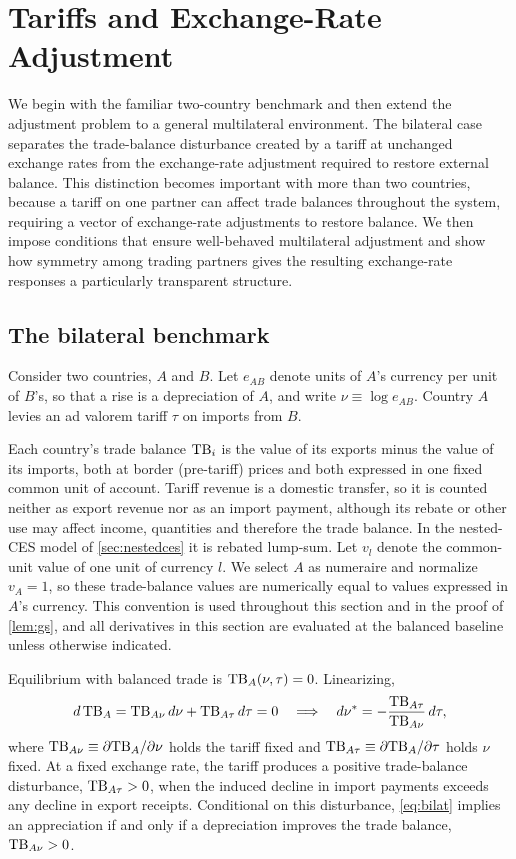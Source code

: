 \section{Tariffs and Exchange-Rate Adjustment}
\label{sec:framework}

We begin with the familiar two-country benchmark and then extend the adjustment problem to a general multilateral environment. The bilateral case separates the trade-balance disturbance created by a tariff at unchanged exchange rates from the exchange-rate adjustment required to restore external balance. This distinction becomes important with more than two countries, because a tariff on one partner can affect trade balances throughout the system, requiring a vector of exchange-rate adjustments to restore balance. We then impose conditions that ensure well-behaved multilateral adjustment and show how symmetry among trading partners gives the resulting exchange-rate responses a particularly transparent structure.

\subsection{The bilateral benchmark}
\label{sec:bilateral}

Consider two countries, $A$ and $B$. Let $e_{AB}$ denote units of $A$'s currency per unit of $B$'s, so that a rise is a depreciation of $A$, and write $\nu\equiv\log e_{AB}$. Country $A$ levies an ad valorem tariff $\tau$ on imports from $B$.

Each country's trade balance $\mathrm{TB}_i$ is the value of its exports minus the value of its imports, both at border (pre-tariff) prices and both expressed in one fixed common unit of account. Tariff revenue is a domestic transfer, so it is counted neither as export revenue nor as an import payment, although its rebate or other use may affect income, quantities and therefore the trade balance. In the nested-CES model of \cref{sec:nestedces} it is rebated lump-sum. Let $v_l$ denote the common-unit value of one unit of currency $l$. We select $A$ as numeraire and normalize $v_A=1$, so these trade-balance values are numerically equal to values expressed in $A$'s currency. This convention is used throughout this section and in the proof of \cref{lem:gs}, and all derivatives in this section are evaluated at the balanced baseline unless otherwise indicated.

Equilibrium with balanced trade is $\mathrm{TB}_A(\nu,\tau)=0$. Linearizing,
\begin{equation}
d\,\mathrm{TB}_A=\mathrm{TB}_{A\nu}\,d\nu+\mathrm{TB}_{A\tau}\,d\tau=0
\quad\Longrightarrow\quad
d\nu^*=-\frac{\mathrm{TB}_{A\tau}}{\mathrm{TB}_{A\nu}}\,d\tau,
\label{eq:bilat}
\end{equation}
where $\mathrm{TB}_{A\nu}\equiv\partial\mathrm{TB}_A/\partial\nu$ holds the tariff fixed and $\mathrm{TB}_{A\tau}\equiv\partial\mathrm{TB}_A/\partial\tau$ holds $\nu$ fixed. At a fixed exchange rate, the tariff produces a positive trade-balance disturbance, $\mathrm{TB}_{A\tau}>0$, when the induced decline in import payments exceeds any decline in export receipts. Conditional on this disturbance, \cref{eq:bilat} implies an appreciation if and only if a depreciation improves the trade balance, $\mathrm{TB}_{A\nu}>0$.

